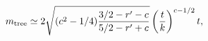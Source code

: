 \begin{equation}
  m_{\rm tree} 
    \simeq 2 \sqrt{(c^2-1/4)\frac{3/2-r'-c}{5/2-r'+c}}
      \left( \frac{t}{k}\right) ^{c-1/2}t,
\end{equation}


